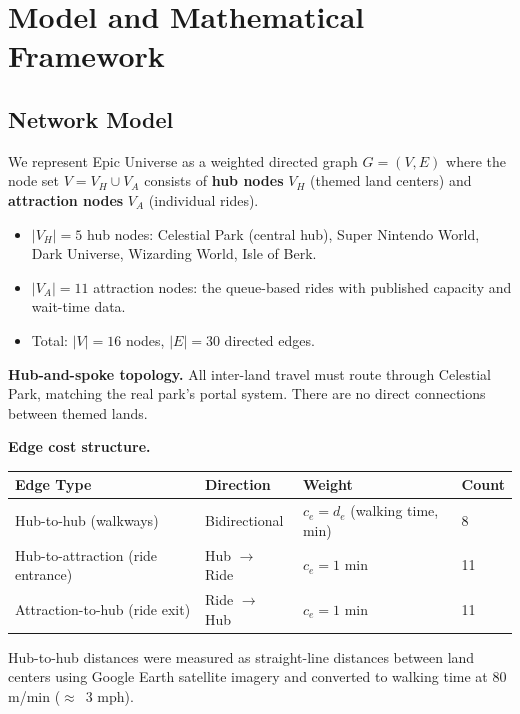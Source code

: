 \documentclass[11pt]{article}
\begin{document}
\section{Model and Mathematical Framework}

\subsection{Network Model}

We represent Epic Universe as a weighted directed graph $G = (V, E)$ where the node set $V = V_H \cup V_A$ consists of \textbf{hub nodes} $V_H$ (themed land centers) and \textbf{attraction nodes} $V_A$ (individual rides).

\begin{itemize}[nosep]
    \item $|V_H| = 5$ hub nodes: Celestial Park (central hub), Super Nintendo World, Dark Universe, Wizarding World, Isle of Berk.
    \item $|V_A| = 11$ attraction nodes: the queue-based rides with published capacity and wait-time data.
    \item Total: $|V| = 16$ nodes, $|E| = 30$ directed edges.
\end{itemize}

\textbf{Hub-and-spoke topology.} All inter-land travel must route through Celestial Park, matching the real park's portal system. There are no direct connections between themed lands.

\textbf{Edge cost structure.}

\begin{table}[H]
\centering
\begin{tabular}{llll}
\toprule
\textbf{Edge Type} & \textbf{Direction} & \textbf{Weight} & \textbf{Count} \\
\midrule
Hub-to-hub (walkways) & Bidirectional & $c_e = d_e$ (walking time, min) & 8 \\
Hub-to-attraction (ride entrance) & Hub $\to$ Ride & $c_e = 1$ min & 11 \\
Attraction-to-hub (ride exit) & Ride $\to$ Hub & $c_e = 1$ min & 11 \\
\bottomrule
\end{tabular}
\end{table}

Hub-to-hub distances were measured as straight-line distances between land centers using Google Earth satellite imagery and converted to walking time at 80 m/min ($\approx$~3 mph).
\end{document}
